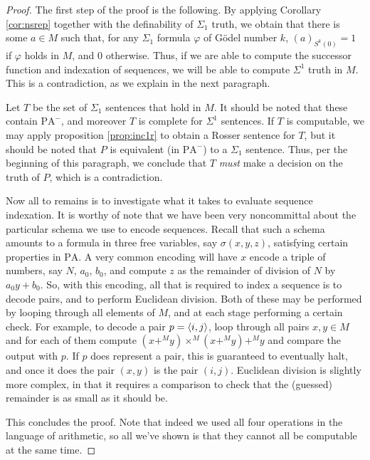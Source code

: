 \documentclass{article}
\theoremstyle{nonumberplain}
\newtheorem{proof}{Proof}
\newcommand{\PA}{\mathrm{PA}}
\newcommand{\WPA}{\PA^-}
\DeclarePairedDelimiter{\braket}{\langle}{\rangle}
\begin{document}
\begin{proof}
The first step of the proof is the following. By applying Corollary \ref{cor:nsrep} together with the definability of $\Sigma_1$ truth, we obtain that there is some $a \in M$ such that, for any $\Sigma_1$ formula $\varphi$ of Gödel number $k$, $(a)_{S^k(0)} = 1$ if $\varphi$ holds in $M$, and $0$ otherwise. Thus, if we are able to compute the successor function and indexation of sequences, we will be able to compute $\Sigma^1$ truth in $M$. This is a contradiction, as we explain in the next paragraph.

Let $T$ be the set of $\Sigma_1$ sentences that hold in $M$. It should be noted that these contain $\WPA$, and moreover $T$ is complete for $\Sigma^1$ sentences. If $T$ is computable, we may apply proposition \ref{prop:inc1r} to obtain a Rosser sentence for $T$, but it should be noted that $P$ is equivalent (in $\WPA$) to a $\Sigma_1$ sentence. Thus, per the beginning of this paragraph, we conclude that $T$ \emph{must} make a decision on the truth of $P$, which is a contradiction.

Now all to remains is to investigate what it takes to evaluate sequence indexation. It is worthy of note that we have been very noncommittal about the particular schema we use to encode sequences. Recall that such a schema amounts to a formula in three free variables, say $\sigma(x,y,z)$, satisfying certain properties in $\PA$. A very common encoding will have $x$ encode a triple of numbers, say $N$, $a_0$, $b_0$, and compute $z$ as the remainder of division of $N$ by $a_0 y + b_0$. So, with this encoding, all that is required to index a sequence is to decode pairs, and to perform Euclidean division. Both of these may be performed by looping through all elements of $M$, and at each stage performing a certain check. For example, to decode a pair $p = \braket{i,j}$, loop through all pairs $x,y \in M$ and for each of them compute $(x +^M y) \times^M (x +^M y) +^M y$ and compare the output with $p$. If $p$ does represent a pair, this is guaranteed to eventually halt, and once it does the pair $(x,y)$ is the pair $(i,j)$. Euclidean division is slightly more complex, in that it requires a comparison to check that the (guessed) remainder is as small as it should be.

This concludes the proof. Note that indeed we used all four operations in the language of arithmetic, so all we've shown is that they cannot all be computable at the same time.
\end{proof}
\end{document}
